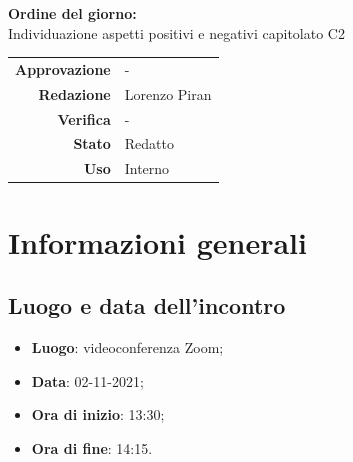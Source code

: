 \documentclass[11pt]{article}
\begin{document}
\begin{titlepage}
\begin{center}
			\large
			
			\vfill
			\textbf{Ordine del giorno:} \\
			Individuazione aspetti positivi e negativi capitolato C2
			
			
			\vfill
			
			
			\begin{tabular}{r|l}
				\textbf{Approvazione} &  -\\
				\textbf{Redazione} &  \parbox[t]{5cm}{Lorenzo Piran}\\
				\textbf{Verifica} &  -\\
				\textbf{Stato} & Redatto \\
				\textbf{Uso} & Interno
			\end{tabular}
			\vfill
			
		\end{center}
	\end{titlepage}

	\section{Informazioni generali}
	\subsection{Luogo e data dell'incontro}
	\begin{itemize}
		\item \textbf{Luogo}: videoconferenza Zoom;
		\item \textbf{Data}: 02-11-2021;
		\item \textbf{Ora di inizio}: 13:30;
		\item \textbf{Ora di fine}: 14:15.
	\end{itemize}
	
\end{document}
